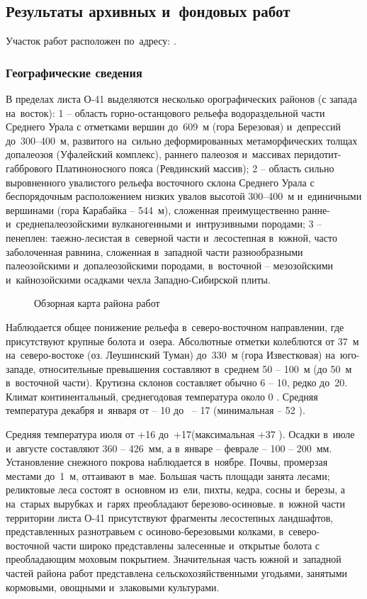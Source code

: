 \subsection{Результаты архивных и~фондовых работ}
Участок работ расположен по~адресу: \txtAddress.

\subsubsection{Географические сведения}
В пределах листа О-41 выделяются несколько орографических районов (с запада на~восток): 1 -- область горно-останцового рельефа водораздельной части Среднего Урала с отметками вершин до~609~м (гора Березовая) и~депрессий до~300--400~м, развитого на~сильно деформированных метаморфических толщах допалеозоя (Уфалейский комплекс), раннего палеозоя и~массивах перидотит-габбрового Платиноносного пояса (Ревдинский массив); 2 -- область сильно выровненного увалистого рельефа восточного склона Среднего Урала с беспорядочным расположением низких
увалов высотой 300--400~м и~единичными вершинами (гора Карабайка -- 544~м), сложенная преимущественно ранне- и~среднепалеозойскими вулканогенными и~интрузивными породами; 3  --  пенеплен: таежно-лесистая в~северной части и~лесостепная в~южной, часто заболоченная равнина, сложенная в~западной части разнообразными палеозойскими и~допалеозойскими породами, в~восточной  --  мезозойскими и~кайнозойскими осадками чехла Западно-Сибирской плиты. 
\begin{figure}[h]
	\caption{Обзорная карта района работ}
\end{figure}
Наблюдается общее понижение рельефа в~северо-восточном направлении, где присутствуют крупные болота и~озера. Абсолютные отметки колеблются от 37~м на~северо-востоке (оз. Леушинский Туман) до~330~м (гора Известковая) на~юго-западе, относительные превышения составляют в~среднем 50 -- 100~м (до 50~м в~восточной части). Крутизна склонов составляет обычно 6 -- 10\degree, редко до~20\degree.
Климат континентальный, среднегодовая температура около 0 . Средняя температура декабря и~января от  -- 10 до~ -- 17  (минимальная  -- 52 ).

Средняя температура июля от +16 до~+17\degree (максимальная +37 ). Осадки в~июле и~августе составляют 360 -- 426~мм, а в~январе -- феврале  --  100 -- 200~мм.
Установление снежного покрова наблюдается в~ноябре. Почвы, промерзая местами до~1~м, оттаивают в~мае. Большая часть площади занята лесами; реликтовые леса состоят в~основном из~ели, пихты, кедра, сосны и~березы, а на~старых вырубках и~гарях преобладают березово-осиновые. в~южной части территории листа О-41 присутствуют фрагменты лесостепных ландшафтов, представленных разнотравьем с осиново-березовыми колками, в~северо-восточной части широко представлены залесенные и~открытые болота с преобладающим моховым покрытием. Значительная часть южной и~западной частей района работ представлена сельскохозяйственными угодьями, занятыми кормовыми, овощными и~злаковыми культурами. 

